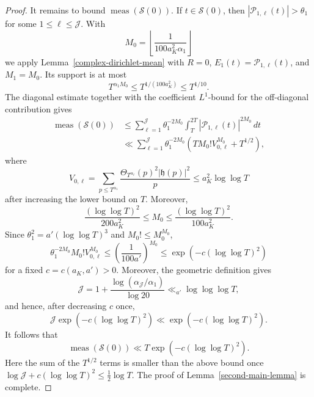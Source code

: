\documentclass[twoside,reqno,11pt,a4paper]{amsart}
\numberwithin{equation}{section}
\theoremstyle{plain}
\theoremstyle{definition}
\theoremstyle{remark}
\renewcommand{\le}{\leqslant}
\begin{document}
\begin{proof}
It remains to bound $\operatorname{meas}(\mathcal S(0))$.  If $t\in\mathcal S(0)$, then $|\mathcal P_{1,\ell}(t)|>\theta_1$ for some $1\le\ell\le\mathcal J$.  With
\begin{equation*}
        M_0=\left\lfloor\frac{1}{100a_K^2\alpha_1}\right\rfloor
\end{equation*}
we apply Lemma~\ref{complex-dirichlet-mean} with $R=0$, $E_1(t)=\mathcal P_{1,\ell}(t)$, and $M_1=M_0$.  Its support is at most
\begin{equation*}
        T^{\alpha_1M_0}\le T^{1/(100a_K^2)}\le T^{1/10}.
\end{equation*} The diagonal estimate together with the coefficient $L^1$-bound for the off-diagonal contribution gives
\begin{align*}
        \operatorname{meas}(\mathcal S(0))
        &\le
        \sum_{\ell=1}^{\mathcal J}\theta_1^{-2M_0}
        \int_T^{2T}|\mathcal P_{1,\ell}(t)|^{2M_0}\,dt                         \\
        &\ll
        \sum_{\ell=1}^{\mathcal J}
        \theta_1^{-2M_0}
        \left(T M_0!V_{0,\ell}^{M_0}+T^{1/2}\right),
\end{align*}
where
\begin{equation*}
        V_{0,\ell}=\sum_{p\le  T^{\alpha_1}}
        \frac{\Theta_{T^{\alpha_\ell}}(p)^2|\mathfrak h(p)|^2}{p}
        \le a_K^2\log\log T
\end{equation*}
after increasing the lower bound on $T$.  Moreover,
\begin{equation*}
\frac{(\log\log T)^2}{200a_K^2}
\le M_0\le\frac{(\log\log T)^2}{100a_K^2}.
\end{equation*}
Since $\theta_1^2=a'(\log\log T)^3$ and $M_0!\le M_0^{M_0}$,
\begin{equation*}
        \theta_1^{-2M_0}M_0!V_{0,\ell}^{M_0}
        \le
        \left(\frac1{100a'}\right)^{M_0}
        \le\exp(-c(\log\log T)^2)
\end{equation*}
for a fixed $c=c(a_K,a')>0$.  Moreover, the geometric definition gives
\begin{equation*}
        \mathcal J
        =1+\frac{\log(\alpha_{\mathcal J}/\alpha_1)}{\log20}
        \ll_{a'}\log\log\log T,
\end{equation*}
and hence, after decreasing $c$ once,
\begin{equation*}
        \mathcal J\exp(-c(\log\log T)^2)
        \ll \exp(-c(\log\log T)^2).
\end{equation*}
It follows that
\begin{equation*}
        \operatorname{meas}(\mathcal S(0))
        \ll
        T\exp(-c(\log\log T)^2).
\end{equation*}
Here the sum of the $T^{1/2}$ terms is smaller than the above bound once
$\log\mathcal J+c(\log\log T)^2\le\frac12\log T$.
The proof of Lemma~\ref{second-main-lemma} is complete.
\end{proof}
\end{document}
